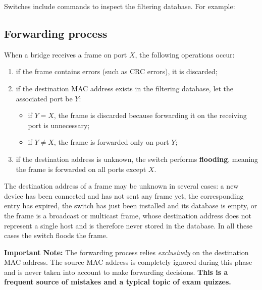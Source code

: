 Switches include commands to inspect the filtering database. For example:

\begin{center}
\end{center}



\subsection{Forwarding process}

When a bridge receives a frame on port $X$, the following operations occur:
\begin{enumerate}
\item if the frame contains errors (such as CRC errors), it is discarded;
\item if the destination MAC address exists in the filtering database, let the associated port be $Y$:
\begin{itemize}
\item if $Y = X$, the frame is discarded because forwarding it on the receiving port is unnecessary;
\item if $Y \neq X$, the frame is forwarded only on port $Y$;
\end{itemize}
\item if the destination address is unknown, the switch performs \textbf{flooding}, meaning the frame is forwarded on all ports except $X$.
\end{enumerate}

The destination address of a frame may be unknown in several cases: a new device has been connected and has not sent any frame yet, the corresponding entry has expired, the switch has just been installed and its database is empty, or the frame is a broadcast or multicast frame, whose destination address does not represent a single host and is therefore never stored in the database. In all these cases the switch floods the frame.


\begin{center}
\end{center}


\textbf{Important Note:} The forwarding process relies \textit{exclusively} on the destination MAC address. The source MAC address is completely ignored during this phase and is never taken into account to make forwarding decisions. \textbf{This is a frequent source of mistakes and a typical topic of exam quizzes.}
   

